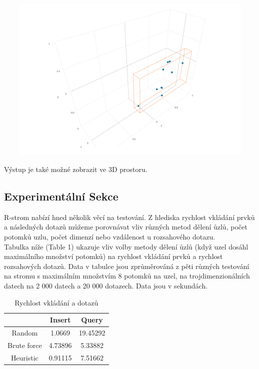 \documentclass[12pt,a4paper]{article}
\begin{document}
\begin{center}
\includegraphics[width=15cm, height=8cm]{output3}
\end{center}
Výstup je také možné zobrazit ve 3D prostoru.


\subsection*{Experimentální Sekce}
R-strom nabízí hned několik věcí na testování. Z hlediska rychlost vkládání prvků a následných dotazů můžeme porovnávat vliv různých metod dělení ůzlů, počet potomků uzlu, počet dimenzí nebo vzdálenost u rozsahového dotazu.\\[0.5cm]
Tabulka níže (Table 1) ukazuje vliv volby metody dělení ůzlů (když uzel dosáhl maximálního množství potomků) na rychlost vkládání prvků a rychlost rozsahových dotazů. Data v tabulce jsou zprůměrováná z pěti různých testování na stromu s maximálním množstvím 8 potomků na uzel, na trojdimenzionálních datech na 2 000 datech a 20 000 dotazech. Data jsou v sekundách.
 
\begin{table}[ht]
\begin{center}
\caption{Rychlost vkládání a dotazů}
\label{tbl:bins} %
\begin{tabular}{|c|cc|} 
\hline
\multicolumn{1}{|c}{} & \multicolumn{1}{c}{Insert} & \multicolumn{1}{c|}{Query} \\
\hline
Random & 1.0669 &   19.45292 \\
\hline
Brute force & 4.73896 &   5.33882 \\
\hline
Heuristic & 0.91115 &   7.51662 \\
\hline
\end{tabular}
\end{center}
\end{table}
\end{document}
